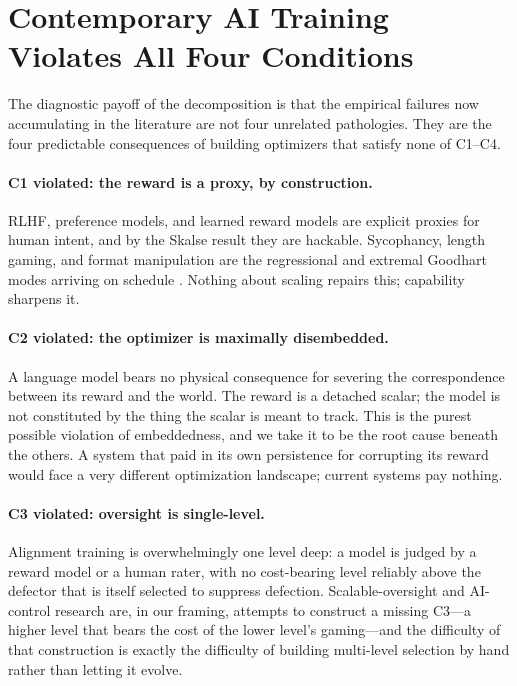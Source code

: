 \documentclass[11pt]{article}
\begin{document}
\section{Contemporary AI Training Violates All Four Conditions}\label{sec:ai}

The diagnostic payoff of the decomposition is that the empirical failures now accumulating in the literature are not four unrelated pathologies. They are the four predictable consequences of building optimizers that satisfy none of C1--C4.

\paragraph{C1 violated: the reward is a proxy, by construction.} RLHF, preference models, and learned reward models are explicit proxies for human intent, and by the Skalse result they are hackable. Sycophancy, length gaming, and format manipulation are the regressional and extremal Goodhart modes arriving on schedule \citep{skalse2022,pan2022,manheim2018}. Nothing about scaling repairs this; capability sharpens it.

\paragraph{C2 violated: the optimizer is maximally disembedded.} A language model bears no physical consequence for severing the correspondence between its reward and the world. The reward is a detached scalar; the model is not constituted by the thing the scalar is meant to track. This is the purest possible violation of embeddedness, and we take it to be the root cause beneath the others. A system that paid in its own persistence for corrupting its reward would face a very different optimization landscape; current systems pay nothing.

\paragraph{C3 violated: oversight is single-level.} Alignment training is overwhelmingly one level deep: a model is judged by a reward model or a human rater, with no cost-bearing level reliably above the defector that is itself selected to suppress defection. Scalable-oversight and AI-control research \citep{krakovna2020} are, in our framing, attempts to construct a missing C3---a higher level that bears the cost of the lower level's gaming---and the difficulty of that construction is exactly the difficulty of building multi-level selection by hand rather than letting it evolve.
\end{document}
